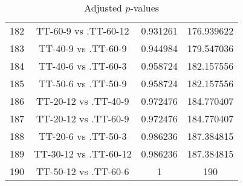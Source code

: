 \documentclass[a4paper,10pt]{article}
\begin{document}
\begin{landscape}
\begin{table}[!htp]
\begin{tabular}{cccc}
182&TT-60-9 vs .TT-60-12&0.931261&176.939622\\
183&TT-40-9 vs .TT-60-9&0.944984&179.547036\\
184&TT-40-6 vs .TT-60-3&0.958724&182.157556\\
185&TT-50-6 vs .TT-50-9&0.958724&182.157556\\
186&TT-20-12 vs .TT-40-9&0.972476&184.770407\\
187&TT-20-12 vs .TT-60-9&0.972476&184.770407\\
188&TT-20-6 vs .TT-50-3&0.986236&187.384815\\
189&TT-30-12 vs .TT-60-12&0.986236&187.384815\\
190&TT-50-12 vs .TT-60-6&1&190\\
\hline
\end{tabular}
\caption{Adjusted $p$-values}
\end{table}

\end{landscape}
\end{document}
